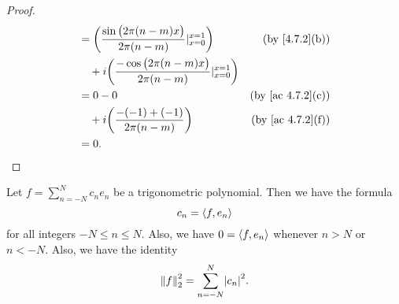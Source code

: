 \begin{proof}
\begin{align*}
     & = \bigg(\frac{\sin\big(2 \pi (n - m) x\big)}{2 \pi (n - m)}|_{x = 0}^{x = 1}\bigg)          & \text{(by \cref{4.7.2}(b))}    \\
     & \quad + i \bigg(\frac{-\cos\big(2 \pi (n - m) x\big)}{2 \pi (n - m)}|_{x = 0}^{x = 1}\bigg)                                  \\
     & = 0 - 0                                                                                     & \text{(by \cref{ac 4.7.2}(c))} \\
     & \quad + i \bigg(\frac{- (-1) + (-1)}{2 \pi (n - m)}\bigg)                                   & \text{(by \cref{ac 4.7.2}(f))} \\
     & = 0.
  \end{align*}
\end{proof}

\begin{corollary}\label{5.3.6}
  Let \(f = \sum_{n = -N}^N c_n e_n\) be a trigonometric polynomial.
  Then we have the formula
  \[
    c_n = \inner*{f, e_n}
  \]
  for all integers \(-N \leq n \leq N\).
  Also, we have \(0 = \inner*{f, e_n}\) whenever \(n > N\) or \(n < -N\).
  Also, we have the identity
  \[
    \norm*{f}_2^2 = \sum_{n = -N}^N \abs{c_n}^2.
  \]
\end{corollary}

